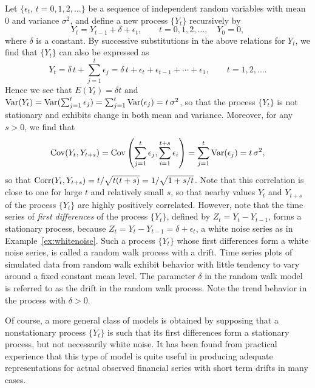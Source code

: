 \begin{ex} \label{ex:driftwalk} 
Let $\{ \epsilon_t, \, t=0,1,2, \ldots \}$ be a sequence of independent random variables with mean 0 and variance $\sigma^2$, and define a new process $\{ Y_t \}$ recursively by
	\[
	Y_t = Y_{t-1} + \delta + \epsilon_t, \qquad t=0,1,2, \ldots, \quad Y_0 = 0,
	\]
where $\delta$ is a constant.  By successive substitutions in the above relations for $Y_t$, we find that $\{Y_t\}$ can also be expressed as
	\[
	Y_t = \delta \, t + \sum_{j=1}^t \epsilon_j = \delta \, t + \epsilon_{t} + \epsilon_{t-1} + \cdots + \epsilon_{1}, \qquad t= 1, 2, \ldots .
	\]
Hence we see that $E(Y_t)= \delta t$ and $\operatorname{Var}(Y_t)= \operatorname{Var}(\sum_{j=1}^t \epsilon_j)= \sum_{j=1}^t \operatorname{Var}(\epsilon_j)= t \, \sigma^2$, so that the process $\{ Y_t \}$ is not stationary and exhibits change in both mean and variance.  Moreover, for any $s > 0$, we find that
	\[
	\operatorname{Cov}(Y_t,Y_{t+s})= \operatorname{Cov} \left( \sum_{j=1}^t \epsilon_j, \sum_{i=1}^{t+s} \epsilon_i \right)= \sum_{j=1}^t \operatorname{Var}(\epsilon_j) = t \, \sigma^2 ,
	\]
so that $\operatorname{Corr}(Y_t,Y_{t + s}) = t / \sqrt{t(t + s)} = 1/ \sqrt{1 + s/t}$. Note that this correlation is close to one for large $t$ and relatively small $s$, so that nearby values $Y_t$ and $Y_{t+s}$ of the process $\{Y_t\}$ are highly positively correlated.  However, note that the time series of \emph{first differences} of the process $\{ Y_t \}$, defined by $Z_{t}=Y_{t}-Y_{t-1}$, forms a stationary process, because $Z_{t}= Y_{t} - Y_{t-1} = \delta + \epsilon_t$, a white noise series as in Example~\ref{ex:whitenoise}. Such a process $\{ Y_t \}$ whose first differences form a white noise series, is called a random walk process with a drift. Time series plots of simulated data from random walk exhibit behavior with little tendency to vary around a fixed constant mean level. The parameter $\delta$ in the random walk model is referred to as the drift in the random walk process. Note the trend behavior in the process with $\delta > 0$. \xqed
\end{ex}


Of course, a more general class of models is obtained by supposing that a nonstationary process $\{ Y_t \}$ is such that its first differences form a stationary process, but not necessarily white noise.  It has been found from practical experience that this type of model is quite useful in producing adequate representations for actual observed financial series with short term drifts in many cases.



